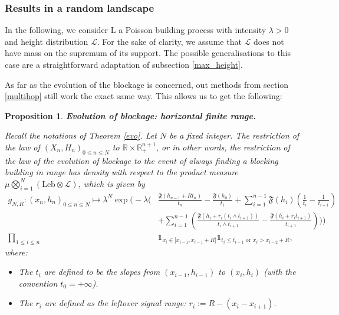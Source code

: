 \documentclass[10pt,english,a4paper]{smfart}
\newtheorem{proposition}{Proposition}[section]
\theoremstyle{definition}
\theoremstyle{remark}
\newcommand{\R}{\mathbb{R}}
\newcommand{\Leb}{\mathrm{Leb}}
\newcommand{\landsc}{\mathrm{L}}
\newcommand{\Half}{\R \times \R_+}
\newcommand{\primi}{\mathfrak{F}}
\begin{document}
\subsubsection*{Results in a random landscape}

In the following, we consider $\landsc$ a Poisson building process with intensity $\lambda>0$ and height distribution $\mathcal{L}$. For the sake of clarity, we assume that $\mathcal{L}$ does not have mass on the supremum of its support. The possible generalisations to this case are a straightforward adaptation of subsection \ref{max_height}.

As far as the evolution of the blockage is concerned, out methods from section \ref{multihop} still work the exact same way. This allows us to get the following:
\newpage
\begin{proposition}\label{evo_finite}\textbf{Evolution of blockage: horizontal finite range.}

Recall the notations of Theorem \ref{evo}. Let $N$ be a fixed integer. The restriction of the law of $(X_n, H_n)_{0\leq n\leq N}$ to $\Half^{n+1}$, or in other words, the restriction of the law of the evolution of blockage to the event of always finding a blocking building in range has density with respect to the product measure $\mu\displaystyle\bigotimes_{i=1}^{N} (\Leb \otimes \mathcal{L})$, which is given by
\begin{align*}
g_{N, R}: (x_n, h_n)_{0\leq n\leq N} \mapsto \lambda^N\exp\Biggl(-\lambda\Biggl(&\frac{\primi(h_{n-1}+Rt_n)}{t_n}-\frac{\primi(h_0)}{t_1}+\sum_{i=1}^{n-1}\primi(h_i)(\frac{1}{t_{i}}-\frac{1}{t_{i+1}})\\
&+ \sum_{i=1}^{n-1} (\frac{\primi(h_i + r_i (t_i \wedge t_{i+1}))}{t_i\wedge t_{i+1}}-\frac{\primi(h_i +r_i t_{i+1})}{t_{i+1}})\Biggl)\Biggl)\\
\prod_{1\leq i\leq n}&\mathds{1}_{x_i\in ]x_{i-1}, x_{i-1}+R]}\mathds{1}_{t_i\leq t_{i-1} \text{ or } x_i > x_{i-2}+R },
\end{align*}
where:
\begin{itemize}
    \item The $t_i$ are defined to be the slopes from $(x_{i-1}, h_{i-1})$ to $(x_i, h_i)$ (with the convention $t_0 = +\infty$).
    \item The $r_i$ are defined as the \textit{leftover signal range}: $r_i := R-(x_i-x_{i+1})$.
\end{itemize}
\end{proposition}
\end{document}
